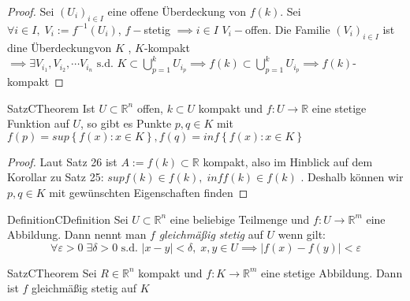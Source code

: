 \begin{proof}
	Sei $ \left( U_{i} \right)_{i \in  I} $   eine offene Überdeckung von $ f(k) $. Sei 
	$ \forall i \in  I, \; V_{i}:= f^{-1} \left( U_{i} \right) $, $ f- $stetig $ \implies i \in I$
	$ V_{i}- $offen. Die Familie $ \left( V_{i} \right)_{i \in  I} $ ist dine Überdeckungvon $ K $
	, $ K $-kompakt $ \implies  \exists V_{i_{1}}, V_{i_{2}} , \cdots V_{i_{n}} \text{ s.d. } K 
	\subset \bigcup\limits_{p = 1}^{k} U_{i_{p}} \implies f(k) \subset  
	\bigcup\limits_{p = 1}^{k} U_{i_{p}} \implies  f(k) $-kompakt
\end{proof}

\begin{ibox}[27]{Satz}{CTheorem}
    Ist $ U \subset \mathbb{R}^n  $ offen, $ k \subset  U $ kompakt und $ f: U \to \mathbb{R}  $
	eine stetige Funktion auf $ U $, so gibt es Punkte $ p,q \in K $ mit $ f(p) = sup \left\{ 
f(x): x \in  K \right\}, f(q) = inf \left\{ f(x): x \in K \right\}   $ 
\end{ibox}

\begin{proof}
	Laut Satz 26 ist $ A := f(k) \subset  \mathbb{R}  $ kompakt, also im Hinblick auf dem Korollar
	zu Satz 25: $ sup f(k) \in  f(k), \; inf f(k) \in  f(k) $ . Deshalb können wir $ p,q \in K $ 
	mit gewünschten Eigenschaften finden
\end{proof}

\begin{ibox}[]{Definition}{CDefinition}
    Sei $ U \subset  \mathbb{R}^n  $ eine beliebige Teilmenge und $ f: U \to \mathbb{R}^m  $ eine 
	Abbildung. Dann nennt man $ f $ \textit{gleichmäßig stetig} auf $ U $ wenn gilt:
	$$ \forall \varepsilon > 0 \; \exists \delta > 0 \text{ s.d. } \left| x - y \right| < \delta , 
	 \; x,y \in  U \implies  \left| f(x) - f(y) \right| < \varepsilon  $$
\end{ibox}

\begin{ibox}[28]{Satz}{CTheorem}
    Sei $ R \in  \mathbb{R}^n $ kompakt und $ f: K \to \mathbb{R}^m $ eine stetige Abbildung.
	Dann ist $ f $ gleichmäßig stetig auf $ K $ 
\end{ibox}

